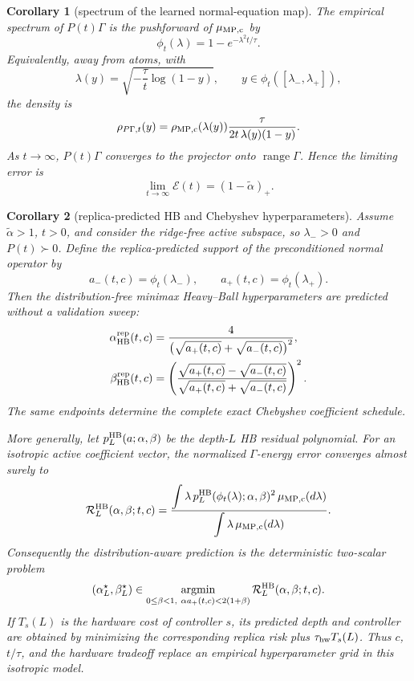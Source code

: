 \documentclass[11pt,a4paper]{article}
\newtheorem{corollary}{Corollary}
\theoremstyle{definition}
\begin{document}
\begin{corollary}[spectrum of the learned normal-equation map]
\label{cor:pgspectrum}
The empirical spectrum of $P(t)\Gamma$ is the pushforward of
$\mu_{\rm MP,c}$ by
\[
    \phi_t(\lambda)=
    1-e^{-\lambda^2t/\tau}.
\]
Equivalently, away from atoms, with
\[
    \lambda(y)=
    \sqrt{-\frac{\tau}{t}\log(1-y)},
    \qquad
    y\in \phi_t([\lambda_-,\lambda_+]),
\]
the density is
\[
    \rho_{P\Gamma,t}(y)
    =
    \rho_{\rm MP,c}(\lambda(y))
    \frac{\tau}{2t\,\lambda(y)(1-y)}.
\]
As $t\to\infty$, $P(t)\Gamma$ converges to the projector onto
$\operatorname{range}\Gamma$.  Hence the limiting error is
\[
    \lim_{t\to\infty}\mathcal E(t)
    =
    (1-\widetilde\alpha)_+ .
\]
\end{corollary}

\begin{corollary}[replica-predicted HB and Chebyshev hyperparameters]
\label{cor:replicahbhyperparameters}
Assume $\widetilde\alpha>1$, $t>0$, and consider the ridge-free active
subspace, so $\lambda_->0$ and $P(t)\succ0$.  Define the replica-predicted
support of the preconditioned normal operator by
\[
    a_-(t,c)=\phi_t(\lambda_-),
    \qquad
    a_+(t,c)=\phi_t(\lambda_+).
\]
Then the distribution-free minimax Heavy--Ball hyperparameters are predicted
without a validation sweep:
\begin{align}
    \alpha_{\rm HB}^{\rm rep}(t,c)
    &=\frac{4}{
        \bigl(\sqrt{a_+(t,c)}+\sqrt{a_-(t,c)}\bigr)^2},
        \label{eq:rep-hb-alpha}\\
    \beta_{\rm HB}^{\rm rep}(t,c)
    &=\left(
        \frac{\sqrt{a_+(t,c)}-\sqrt{a_-(t,c)}}
             {\sqrt{a_+(t,c)}+\sqrt{a_-(t,c)}}
      \right)^2.
        \label{eq:rep-hb-beta}
\end{align}
The same endpoints determine the complete exact Chebyshev coefficient
schedule.

More generally, let $p_L^{\rm HB}(a;\alpha,\beta)$ be the depth-$L$ HB
residual polynomial.  For an isotropic active coefficient vector, the
normalized $\Gamma$-energy error converges almost surely to
\begin{equation}
    \mathcal R_L^{\rm HB}(\alpha,\beta;t,c)
    =
    \frac{
      \displaystyle\int
      \lambda\,
      p_L^{\rm HB}(\phi_t(\lambda);\alpha,\beta)^2
      \,\mu_{\rm MP,c}(d\lambda)
    }{
      \displaystyle\int\lambda\,\mu_{\rm MP,c}(d\lambda)
    }.
    \label{eq:rep-hb-distributional-risk}
\end{equation}
Consequently the distribution-aware prediction is the deterministic
two-scalar problem
\begin{equation}
    (\alpha_L^\star,\beta_L^\star)
    \in\operatorname*{argmin}_{
      0\leq\beta<1,
      \ \alpha a_+(t,c)<2(1+\beta)}
    \mathcal R_L^{\rm HB}(\alpha,\beta;t,c).
    \label{eq:rep-hb-distributional-optimum}
\end{equation}
If $T_s(L)$ is the hardware cost of controller $s$, its predicted depth and
controller are obtained by minimizing the corresponding replica risk plus
$\tau_{\rm hw}T_s(L)$.  Thus $c$, $t/\tau$, and the hardware tradeoff replace
an empirical hyperparameter grid in this isotropic model.
\end{corollary}
\end{document}
